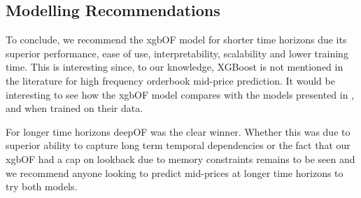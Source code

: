 \subsection{Modelling Recommendations}
To conclude, we recommend the xgbOF model for shorter time horizons due its superior performance,
ease of use, interpretability, scalability and lower training time.
This is interesting since, to our knowledge, XGBoost is not mentioned in the literature for high frequency orderbook mid-price prediction.
It would be interesting to see how the xgbOF model compares with the models presented in \cite{ZHANG2019}, \cite{KOLM2023} and \cite{LUCCHESE2024} when trained on their data.


For longer time horizons deepOF was the clear winner. Whether this was due to superior ability to capture long term
temporal dependencies or the fact that our xgbOF had a cap on lookback due to memory constraints remains to be seen
and we recommend anyone looking to predict mid-prices at longer time horizons to try both models.

